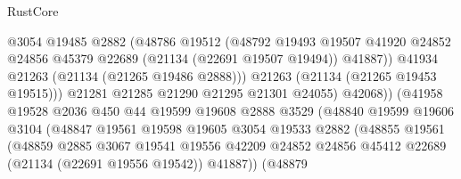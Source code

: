 \begin{lexlean}{RustCore}
\begin{coremodule}
                                    @3054
                                    @19485
                                    @2882
                                    (@48786
                                      @19512
                                      (@48792
                                        @19493
                                        @19507
                                        @41920
                                        @24852
                                        @24856
                                        @45379
                                        @22689
                                        (@21134 (@22691 @19507 @19494))
                                        @41887))
                                    @41934
                                    @21263
                                    (@21134 (@21265 @19486 @2888)))
                                  @21263
                                  (@21134 (@21265 @19453 @19515)))
                                @21281
                                @21285
                                @21290
                                @21295
                                @21301
                                @24055)
                              @42068))
                          (@41958
                            @19528
                            @2036
                            @450
                            @44
                            @19599
                            @19608
                            @2888
                            @3529
                            (@48840
                              @19599
                              @19606
                              @3104
                              (@48847
                                @19561
                                @19598
                                @19605
                                @3054
                                @19533
                                @2882
                                (@48855
                                  @19561
                                  (@48859
                                    @2885
                                    @3067
                                    @19541
                                    @19556
                                    @42209
                                    @24852
                                    @24856
                                    @45412
                                    @22689
                                    (@21134 (@22691 @19556 @19542))
                                    @41887))
                                (@48879

\end{coremodule}
\end{lexlean}
